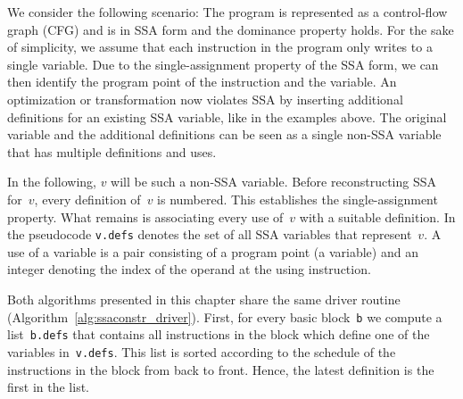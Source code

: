 We consider the following scenario:
The program is represented as a control-flow graph (CFG) and is in SSA form and the dominance property holds.
For the sake of simplicity, we assume that each instruction in the program only writes to a single variable.
Due to the single-assignment property of the SSA form, we can then identify the program point of the instruction and the variable. 
An optimization or transformation now violates SSA by inserting additional definitions for an existing SSA variable, like in the examples above.
The original variable and the additional definitions can be seen as a single non-SSA variable that has multiple definitions and uses.

In the following, $v$ will be such a non-SSA variable.
Before reconstructing SSA for~$v$, every definition of~$v$ is numbered. 
This establishes the single-assignment property. 
What remains is associating every use of~$v$ with a suitable definition.
In the pseudocode \verb|v.defs| denotes the set of all SSA variables that represent~$v$.
A use of a variable is a pair consisting of a program point (a variable) and an integer denoting the index of the operand at the using instruction.

Both algorithms presented in this chapter share the same driver routine (Algorithm~\ref{alg:ssaconstr_driver}).
First, for every basic block~\verb|b| we compute a list~\verb|b.defs| that contains all instructions in the block which define one of the variables in~\verb|v.defs|.
This list is sorted according to the schedule of the instructions in the block from back to front.
Hence, the latest definition is the first in the list.

